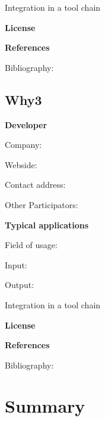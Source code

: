 \documentclass{./template/openetcs_report}
\begin{document}


	Integration in a tool chain



	\textbf{License}


	\textbf{References}

	Bibliography:

\subsection{Why3}

	\textbf{Developer}

	Company: 

	Webside:

	Contact address:

	Other  Participators:



	\textbf{Typical applications}

	Field of usage:


	Input:

	Output:





	Integration in a tool chain



	\textbf{License}


	\textbf{References}

	Bibliography:


\section{Summary}
\end{document}
